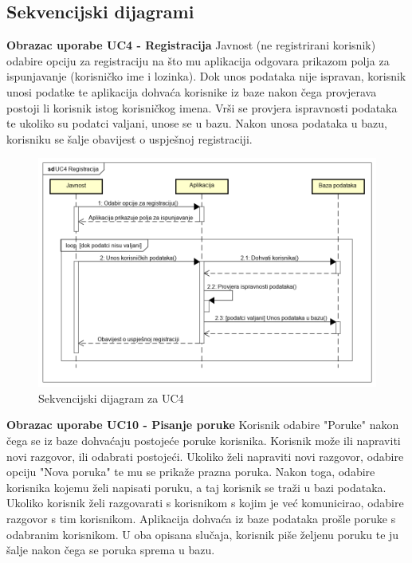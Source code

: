 				
			\subsection{Sekvencijski dijagrami}
				
				\textbf{Obrazac uporabe UC4 - Registracija}
				\newline
				Javnost (ne registrirani korisnik) odabire opciju za registraciju na što mu aplikacija odgovara prikazom polja za ispunjavanje (korisničko ime i lozinka). Dok unos podataka nije ispravan, korisnik unosi podatke te aplikacija dohvaća korisnike iz baze nakon čega provjerava postoji li korisnik istog korisničkog imena. Vrši se provjera ispravnosti podataka te ukoliko su podatci valjani, unose se u bazu. Nakon unosa podataka u bazu, korisniku se šalje obavijest o uspješnoj registraciji. 
				
				\begin{figure}[H]
					\begin{center}
						\includegraphics[width=15cm]{slike/UC4.PNG}
					\end{center}
					\caption{Sekvencijski dijagram za UC4}
					\label{fig:uc4}
				\end{figure}
			
				\textbf{Obrazac uporabe UC10 - Pisanje poruke}
				\newline
				Korisnik odabire "Poruke" nakon čega se iz baze dohvaćaju postojeće poruke korisnika. Korisnik može ili napraviti novi razgovor, ili odabrati postojeći. Ukoliko želi napraviti novi razgovor, odabire opciju "Nova poruka" te mu se prikaže prazna poruka. Nakon toga, odabire korisnika kojemu želi napisati poruku, a taj korisnik se traži u bazi podataka. Ukoliko korisnik želi razgovarati s korisnikom s kojim je već komunicirao, odabire razgovor s tim korisnikom. Aplikacija dohvaća iz baze podataka prošle poruke s odabranim korisnikom. U oba opisana slučaja, korisnik piše željenu poruku te ju šalje nakon čega se poruka sprema u bazu.
			
